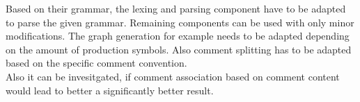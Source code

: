 Based on their grammar, the lexing and parsing component have to be adapted to parse the given grammar. Remaining components can be used with only minor modifications. The graph generation for example needs to be adapted depending on the amount of production symbols. Also comment splitting has to be adapted based on the specific comment convention.\\
Also it can be invesitgated, if comment association based on comment content would lead to better a significantly better result.
